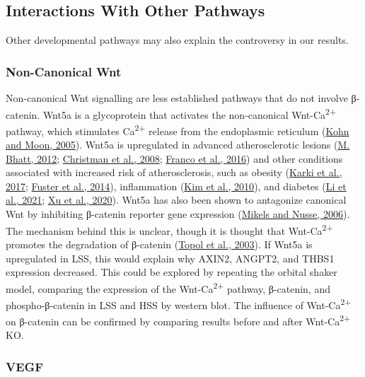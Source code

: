 \documentclass[
  11pt,
]{article}
\begin{document}
\hypertarget{interactions-with-other-pathways}{%
\subsection{Interactions With Other Pathways}\label{interactions-with-other-pathways}}

Other developmental pathways may also explain the controversy in our results.

\hypertarget{non-canonical-wnt}{%
\subsubsection{Non-Canonical Wnt}\label{non-canonical-wnt}}

Non-canonical Wnt signalling are less established pathways that do not involve β-catenin.
Wnt5a is a glycoprotein that activates the non-canonical Wnt-Ca\textsuperscript{2+} pathway, which stimulates Ca\textsuperscript{2+} release from the endoplasmic reticulum (\protect\hyperlink{ref-Kohn2005}{Kohn and Moon, 2005}). Wnt5a is upregulated in advanced atherosclerotic lesions (\protect\hyperlink{ref-Bhatt2012}{M. Bhatt, 2012}; \protect\hyperlink{ref-Christman2008}{Christman et al., 2008}; \protect\hyperlink{ref-franco2016}{Franco et al., 2016}) and other conditions associated with increased risk of atherosclerosis, such as obesity (\protect\hyperlink{ref-karki2017}{Karki et al., 2017}; \protect\hyperlink{ref-fuster2014}{Fuster et al., 2014}), inflammation (\protect\hyperlink{ref-kim2010}{Kim et al., 2010}), and diabetes (\protect\hyperlink{ref-Li2021}{Li et al., 2021}; \protect\hyperlink{ref-Xu2020}{Xu et al., 2020}).
Wnt5a has also been shown to antagonize canonical Wnt by inhibiting β-catenin reporter gene expression (\protect\hyperlink{ref-Mikels2006}{Mikels and Nusse, 2006}).
The mechanism behind this is unclear, though it is thought that Wnt-Ca\textsuperscript{2+} promotes the degradation of β-catenin (\protect\hyperlink{ref-Topol2003}{Topol et al., 2003}).
If Wnt5a is upregulated in LSS, this would explain why AXIN2, ANGPT2, and THBS1 expression decreased.
This could be explored by repeating the orbital shaker model, comparing the expression of the Wnt-Ca\textsuperscript{2+} pathway, β-catenin, and phospho-β-catenin in LSS and HSS by western blot.
The influence of Wnt-Ca\textsuperscript{2+} on β-catenin can be confirmed by comparing results before and after Wnt-Ca\textsuperscript{2+} KO.

\hypertarget{vegf}{%
\subsubsection{VEGF}\label{vegf}}
\end{document}

